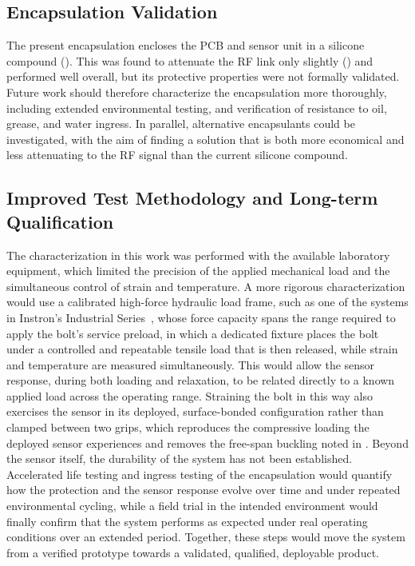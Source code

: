 \subsection{Encapsulation Validation}
The present encapsulation encloses the PCB and sensor unit in a silicone compound (). This was found to attenuate the RF link only slightly () and performed well overall, but its protective properties were not formally validated. Future work should therefore characterize the encapsulation more thoroughly, including extended environmental testing, and verification of resistance to oil, grease, and water ingress. In parallel, alternative encapsulants could be investigated, with the aim of finding a solution that is both more economical and less attenuating to the RF signal than the current silicone compound.

\subsection{Improved Test Methodology and Long-term Qualification} \label{sec:improved_test}
The characterization in this work was performed with the available laboratory equipment, which limited the precision of the applied mechanical load and the simultaneous control of strain and temperature. A more rigorous characterization would use a calibrated high-force hydraulic load frame, such as one of the systems in Instron's Industrial Series~\cite{instron_industrial}, whose force capacity spans the range required to apply the bolt's service preload, in which a dedicated fixture places the bolt under a controlled and repeatable tensile load that is then released, while strain and temperature are measured simultaneously. 
This would allow the sensor response, during both loading and relaxation, to be related directly to a known applied load across the operating range.
Straining the bolt in this way also exercises the sensor in its deployed, surface-bonded configuration rather than clamped between two grips, which reproduces the compressive loading the deployed sensor experiences and removes the free-span buckling noted in .
Beyond the sensor itself, the durability of the system has not been established. Accelerated life testing and ingress testing of the encapsulation would quantify how the protection and the sensor response evolve over time and under repeated environmental cycling, while a field trial in the intended environment would finally confirm that the system performs as expected under real operating conditions over an extended period. Together, these steps would move the system from a verified prototype towards a validated, qualified, deployable product.